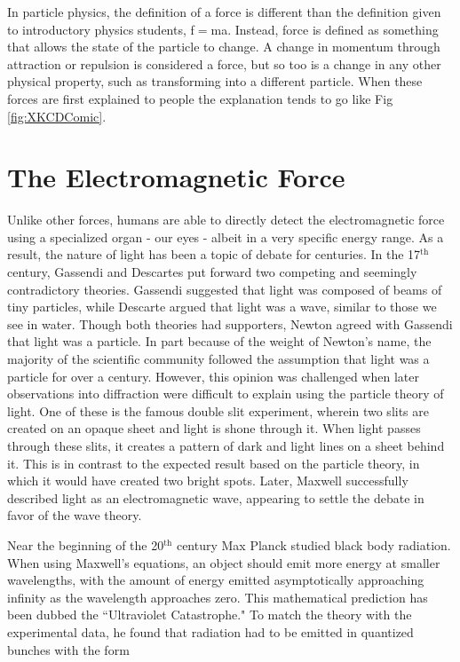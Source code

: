 In particle physics, the definition of a force is different than the definition given to introductory physics students, f$=$ma. Instead, force is defined as something that allows the state of the particle to change. A change in momentum through attraction or repulsion is considered a force, but so too is a change in any other physical property, such as transforming into a different particle. When these forces are first explained to people the explanation tends to go like Fig \ref{fig:XKCDComic}. 


\section{The Electromagnetic Force}
Unlike other forces, humans are able to directly detect the electromagnetic force using a specialized organ - our eyes - albeit in a very specific energy range. As a result, the nature of light has been a topic of debate for centuries. In the 17$^\text{th}$ century, Gassendi and Descartes put forward two competing and seemingly contradictory theories. Gassendi suggested that light was composed of beams of tiny particles, while Descarte argued that light was a wave, similar to those we see in water. Though both theories had supporters, Newton agreed with Gassendi that light was a particle. In part because of the weight of Newton's name, the majority of the scientific community followed the assumption that light was a particle for over a century. However, this opinion was challenged when later observations into diffraction were difficult to explain using the particle theory of light. One of these is the famous double slit experiment, wherein two slits are created on an opaque sheet and light is shone through it. When light passes through these slits, it creates a pattern of dark and light lines on a sheet behind it. This is in contrast to the expected result based on the particle theory, in which it would have created two bright spots. Later, Maxwell successfully described light as an electromagnetic wave, appearing to settle the debate in favor of the wave theory\cite{LightHistory}.\par
Near the beginning of the 20$^\text{th}$ century Max Planck studied black body radiation. When using Maxwell's equations, an object should emit more energy at smaller wavelengths, with the amount of energy emitted asymptotically approaching infinity as the wavelength approaches zero.  This mathematical prediction has been dubbed the ``Ultraviolet Catastrophe." To match the theory with the experimental data, he found that radiation had to be emitted in quantized bunches with the form 
